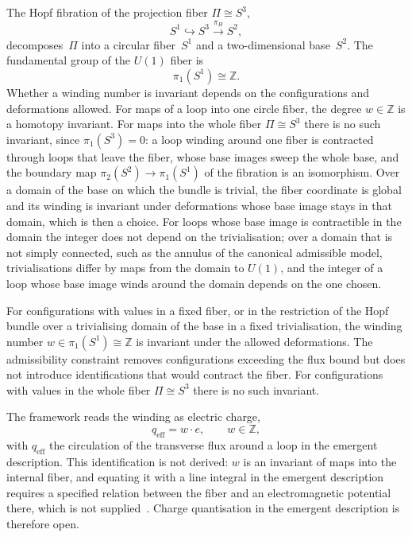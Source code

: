     The Hopf fibration of the projection fiber $\Pi \cong S^3$,
    \begin{equation}
      S^1 \hookrightarrow S^3 \xrightarrow{\pi_H} S^2,
    \end{equation}
    decomposes~$\Pi$ into a circular fiber~$S^1$ and a two-dimensional base~$S^2$.
    The fundamental group of the $U(1)$ fiber is
    \begin{equation}
      \pi_1(S^1) \cong \mathbb{Z}.
    \end{equation}
    Whether a winding number is invariant depends on the configurations and
    deformations allowed.
    For maps of a loop into one circle fiber, the degree $w \in \mathbb{Z}$ is a
    homotopy invariant.
    For maps into the whole fiber $\Pi \cong S^3$ there is no such invariant,
    since $\pi_1(S^3) = 0$: a loop winding around one fiber is contracted
    through loops that leave the fiber, whose base images sweep the whole base,
    and the boundary map $\pi_2(S^2) \to \pi_1(S^1)$ of the fibration is an
    isomorphism.
    Over a domain of the base on which the bundle is trivial, the fiber coordinate
    is global and its winding is invariant under deformations whose base image
    stays in that domain, which is then a choice.
    For loops whose base image is contractible in the domain the integer does not
    depend on the trivialisation; over a domain that is not simply connected, such
    as the annulus of the canonical admissible model, trivialisations differ by maps
    from the domain to $U(1)$, and the integer of a loop whose base image winds around
    the domain depends on the one chosen.

    \begin{proposition}
      \label{prop:charge-quantisation}
      For configurations with values in a fixed fiber, or in the restriction of
      the Hopf bundle over a trivialising domain of the base in a fixed
      trivialisation, the winding number
      $w \in \pi_1(S^1) \cong \mathbb{Z}$ is invariant under the allowed deformations.
      The admissibility constraint removes configurations exceeding the flux bound
      but does not introduce identifications that would contract the fiber.
      For configurations with values in the whole fiber $\Pi \cong S^3$ there is
      no such invariant.
    \end{proposition}

    The framework reads the winding as electric charge,
    \begin{equation}
      q_{\mathrm{eff}} = w \cdot e, \qquad w \in \mathbb{Z},
    \end{equation}
    with $q_{\mathrm{eff}}$ the circulation of the transverse flux around a loop
    in the emergent description.
    This identification is not derived: $w$ is an invariant of maps into the
    internal fiber, and equating it with a line integral in the emergent
    description requires a specified relation between the fiber and an
    electromagnetic potential there, which is not supplied~\cite{Beau2026k}.
    Charge quantisation in the emergent description is therefore open.

